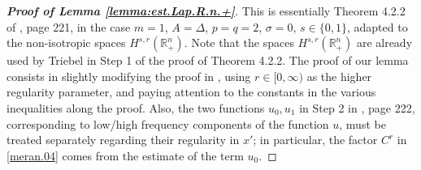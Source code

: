 \documentclass[10pt,reqno,a4paper]{article}
\numberwithin{equation}{section}
\theoremstyle{plain}
\theoremstyle{definition}
\newcommand{\R}{{\mathbb R}}
\newcommand{\s}{\sigma}
\begin{document}
\begin{proof}[\textbf{Proof of Lemma \ref{lemma:est.Lap.R.n.+}}] 
This is essentially Theorem 4.2.2 of \cite{Triebel.1983}, page 221, in the case $m=1$, $A = \Delta$, 
$p=q=2$, $\s=0$, $s \in \{0,1\}$, 
adapted to the non-isotropic spaces $H^{s,r}(\R^n_+)$. 
Note that the spaces $H^{s,r}(\R^n_+)$ are already used by Triebel 
in Step 1 of the proof of Theorem 4.2.2. 
The proof of our lemma consists in slightly modifying the proof in \cite{Triebel.1983}, 
using $r \in [0, \infty)$ as the higher regularity parameter, 
and paying attention to the constants in the various inequalities along the proof. 
Also, the two functions $u_0, u_1$ in Step 2 in \cite{Triebel.1983}, page 222, 
corresponding to low/high frequency components of the function $u$, 
must be treated separately regarding their regularity in $x'$;  
in particular, the factor $C^r$ in \eqref{meran.04} comes from the estimate of the term $u_0$. 
\end{proof}
\end{document}
